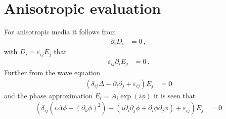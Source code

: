 \documentclass[a4paper,10pt]{revtex4-1}
\begin{document}
\section{Anisotropic evaluation}


For anisotropic media it follows from
\begin{align}
 \partial_i D_i &= 0\,,
\end{align}
with $D_i = \varepsilon_{ij} E_j$ that
\begin{align}
 \varepsilon_{ij} \partial_i E_j &= 0\,.
\end{align}
Further from the wave equation
\begin{align}
 (\delta_{ij} \Delta - \partial_i \partial_j + \varepsilon_{ij}) E_j &= 0
\end{align}
and the phase approximation $E_i = A_i \exp(i \phi)$ it is seen that
\begin{align}
 (\delta_{ij} (i \Delta \phi - (\partial_k \phi)^2) - (i \partial_i \partial_j \phi + \partial_i \phi \partial_j \phi) + \varepsilon_{ij}) E_j &= 0
\end{align}
\end{document}
